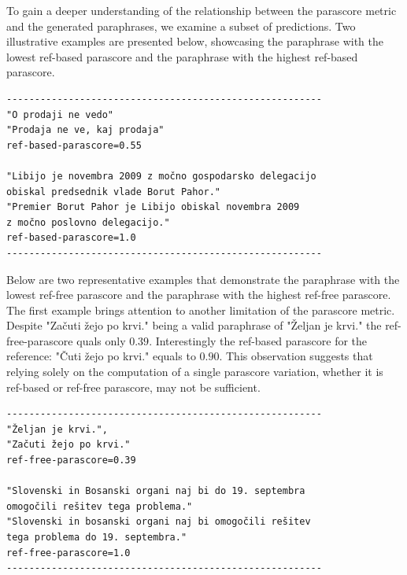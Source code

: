 \documentclass[fleqn,moreauthors,10pt]{ds_report}
\begin{document}
To gain a deeper understanding of the relationship between the parascore metric and the generated paraphrases, we examine a subset of predictions. Two illustrative examples are presented below, showcasing the paraphrase with the lowest ref-based parascore and the paraphrase with the highest ref-based parascore.
\begin{scriptsize}
\begin{verbatim}
--------------------------------------------------------
"O prodaji ne vedo"
"Prodaja ne ve, kaj prodaja"
ref-based-parascore=0.55

"Libijo je novembra 2009 z močno gospodarsko delegacijo 
obiskal predsednik vlade Borut Pahor." 
"Premier Borut Pahor je Libijo obiskal novembra 2009 
z močno poslovno delegacijo."
ref-based-parascore=1.0
--------------------------------------------------------
\end{verbatim}
\end{scriptsize}

Below are two representative examples that demonstrate the paraphrase with the lowest ref-free parascore and the paraphrase with the highest ref-free parascore.  The first example brings attention to another limitation of the parascore metric. Despite "Začuti žejo po krvi." being a valid paraphrase of "Željan je krvi." the ref-free-parascore quals only $0.39$. Interestingly the ref-based parascore for the reference:  "Čuti žejo po krvi." equals to $0.90$. This observation suggests that relying solely on the computation of a single parascore variation, whether it is ref-based or ref-free parascore, may not be sufficient. 

\begin{scriptsize}
\begin{verbatim}
--------------------------------------------------------
"Željan je krvi.",  
"Začuti žejo po krvi."
ref-free-parascore=0.39

"Slovenski in Bosanski organi naj bi do 19. septembra 
omogočili rešitev tega problema."
"Slovenski in bosanski organi naj bi omogočili rešitev
tega problema do 19. septembra."
ref-free-parascore=1.0
--------------------------------------------------------
\end{verbatim}

\end{scriptsize}

\end{document}
